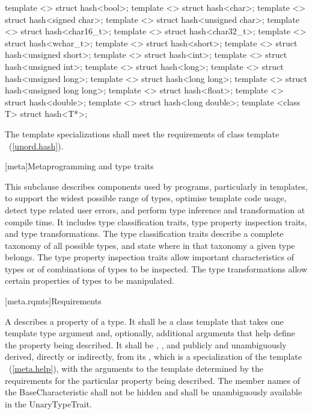 %
\begin{itemdecl}
template <> struct hash<bool>;
template <> struct hash<char>;
template <> struct hash<signed char>;
template <> struct hash<unsigned char>;
template <> struct hash<char16_t>;
template <> struct hash<char32_t>;
template <> struct hash<wchar_t>;
template <> struct hash<short>;
template <> struct hash<unsigned short>;
template <> struct hash<int>;
template <> struct hash<unsigned int>;
template <> struct hash<long>;
template <> struct hash<unsigned long>;
template <> struct hash<long long>;
template <> struct hash<unsigned long long>;
template <> struct hash<float>;
template <> struct hash<double>;
template <> struct hash<long double>;
template <class T> struct hash<T*>;
\end{itemdecl}

\begin{itemdescr}
\pnum
The template specializations shall meet the requirements of class template
~(\ref{unord.hash}).
\end{itemdescr}


[meta]{Metaprogramming and type traits}

\pnum
This subclause describes components used by \Cpp programs, particularly in
templates, to support the widest possible range of types, optimise
template code usage, detect type related user errors, and perform
type inference and transformation at compile time. It includes type
classification traits, type property inspection traits, and type
transformations. The type classification traits describe a complete taxonomy
of all possible \Cpp types, and state where in that taxonomy a given
type belongs. The type property inspection traits allow important
characteristics of types or of combinations of types to be inspected. The
type transformations allow certain properties of types to be manipulated.

[meta.rqmts]{Requirements}

\pnum
A  describes a property
of a type. It shall be a class template that takes one template type
argument and, optionally, additional arguments that help define the
property being described. It shall be ,
,
and publicly and unambiguously derived, directly or indirectly, from
its , which is
a specialization of the template
~(\ref{meta.help}), with
the arguments to the template  determined by the
requirements for the particular property being described.
The member names of the BaseCharacteristic shall not be hidden and shall be
unambiguously available in the UnaryTypeTrait.

